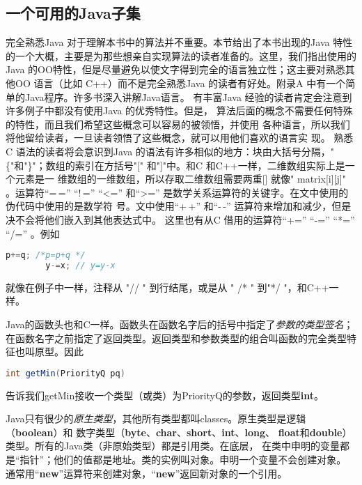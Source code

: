 \subsection{一个可用的\textbf{Java}子集}
完全熟悉Java 对于理解本书中的算法并不重要。本节给出了本书出现的Java
特性的一个大概，主要是为那些想亲自实现算法的读者准备的。这里，我们指出使用的Java
的OO特性，但是尽量避免以使文字得到完全的语言独立性；这主要对熟悉其他OO
语言（比如 C++）而不是完全熟悉Java 的读者有好处。附录A
中有一个简单的Java程序。许多书深入讲解Java语言。 有丰富Java
经验的读者肯定会注意到许多例子中都没有使用Java 的优秀特性。但是，
算法后面的概念不需要任何特殊的特性，而且我们希望这些概念可以容易的被领悟，并使用
各种语言，所以我们将他留给读者，一旦读者领悟了这些概念，就可以用他们喜欢的语言实
现。 熟悉C 语法的读者将会意识到Java
的语法有许多相似的地方：块由大括号分隔，"\{"和"\}"；数组的索引在方括号"["
和"]"中。和C 和C++一样，二维数组实际上是一个元素是一
维数组的一维数组，所以存取二维数组需要两重[] 就像" matrix[i][j]"
。运算符“=\,=” “!\,=” “<=” 和“>=”
是数学关系运算符的关键字。在文中使用的伪代码中使用的是数学符
号。文中使用“+\,+” 和“-\,-”
运算符来增加和减少，但是决不会将他们嵌入到其他表达式中。 这里也有从C
借用的运算符“+=” “-=” “*=” “/=” 。例如
\begin{lstlisting}[language={Java}, keywordstyle=\color{blue!70}, commentstyle=\color{red!50!green!50!blue!50}]
        p+=q; /*p=p+q */
        y-=x; // y=y-x
\end{lstlisting}
\noindent 就像在例子中一样，注释从 "// " 到行结尾，或是从 " /* "
到"*/ "，和C++一样。

Java的函数头也和C一样。函数头在函数名字后的括号中指定了\emph{参数的类型签名}；
在函数名字之前指定了返回类型。返回类型和参数类型的组合叫函数的完全类型特征也叫原型。因此
\begin{lstlisting}[language={Java}, keywordstyle=\color{blue!70}, commentstyle=\color{red!50!green!50!blue!50}]
        int getMin(PriorityQ pq)
\end{lstlisting}
\noindent
告诉我们getMin接收一个类型（或类）为PriorityQ的参数，返回类型\textbf{int}。

Java只有很少的\emph{原生类型}，其他所有类型都叫classes。原生类型是逻辑（\textbf{boolean}）和
数字类型（\textbf{byte}、\textbf{char}、\textbf{short}、\textbf{int}、\textbf{long}、
\textbf{float}和\textbf{double}）类型。所有的Java类（非原始类型）都是引用类。在底层，
在类中申明的变量都是“指针”；他们的值都是地址。类的实例叫对象。申明一个变量不会创建对象。
通常用“\textbf{new}”运算符来创建对象，“\textbf{new}”返回新对象的一个引用。



